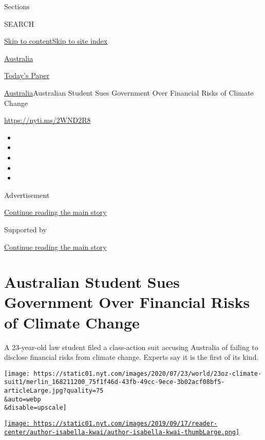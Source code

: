 Sections

SEARCH

\protect\hyperlink{site-content}{Skip to
content}\protect\hyperlink{site-index}{Skip to site index}

\href{https://www.nytimes.com/section/world/australia}{Australia}

\href{https://myaccount.nytimes.com/auth/login?response_type=cookie\&client_id=vi}{}

\href{https://www.nytimes.com/section/todayspaper}{Today's Paper}

\href{/section/world/australia}{Australia}\textbar{}Australian Student
Sues Government Over Financial Risks of Climate Change

\url{https://nyti.ms/2WND2R8}

\begin{itemize}
\item
\item
\item
\item
\item
\end{itemize}

Advertisement

\protect\hyperlink{after-top}{Continue reading the main story}

Supported by

\protect\hyperlink{after-sponsor}{Continue reading the main story}

\hypertarget{australian-student-sues-government-over-financial-risks-of-climate-change}{%
\section{Australian Student Sues Government Over Financial Risks of
Climate
Change}\label{australian-student-sues-government-over-financial-risks-of-climate-change}}

A 23-year-old law student filed a class-action suit accusing Australia
of failing to disclose financial risks from climate change. Experts say
it is the first of its kind.

\texttt{[image: https://static01.nyt.com/images/2020/07/23/world/23oz-climate-suit1/merlin\_168211200\_75f1f46d-43fb-49cc-9ece-3b02acf08bf5-articleLarge.jpg?quality=75\\\&auto=webp\\\&disable=upscale]}

\href{https://www.nytimes.com/by/isabella-kwai}{\texttt{[image: https://static01.nyt.com/images/2019/09/17/reader-center/author-isabella-kwai/author-isabella-kwai-thumbLarge.png]}}

